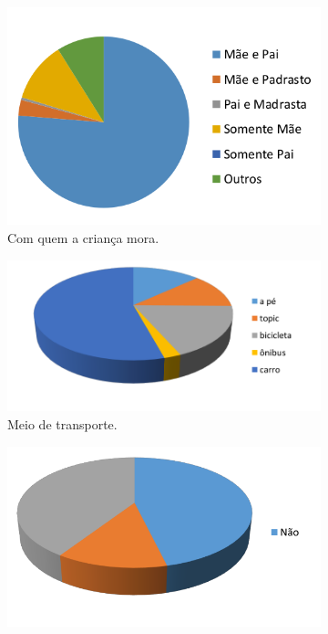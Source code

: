 \begin{figure}[!htbp]
   \centering
   \begin{subfigure}{.3\linewidth}
       \includegraphics[width=.9\linewidth,fbox]{figs/cdi/mora_com.png}
       \caption{Com quem a criança mora.}
       \label{fig:mora_com}
   \end{subfigure}%
   \begin{subfigure}{.3\textwidth}
       \includegraphics[width=.9\linewidth,fbox]{figs/cdi/meio_transporte.png}
       \caption{Meio de transporte.}
       \label{fig:transporte}
   \end{subfigure}%
  \begin{subfigure}{.3\textwidth}
       \includegraphics[width=.9\linewidth,fbox]{figs/cdi/tem_computador.png}

\end{subfigure}
\end{figure}
